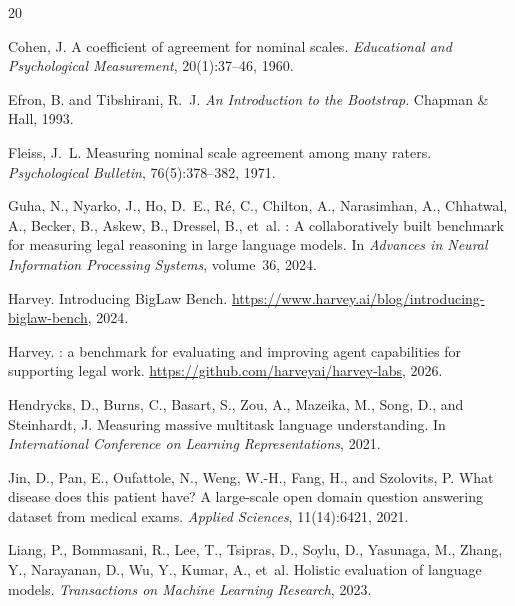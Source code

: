 \documentclass[11pt,a4paper]{article}
\begin{document}
\begin{thebibliography}{20}

Cohen, J.
\newblock A coefficient of agreement for nominal scales.
\newblock \emph{Educational and Psychological Measurement}, 20(1):37--46, 1960.

Efron, B. and Tibshirani, R.~J.
\newblock \emph{An Introduction to the Bootstrap}.
\newblock Chapman \& Hall, 1993.

Fleiss, J.~L.
\newblock Measuring nominal scale agreement among many raters.
\newblock \emph{Psychological Bulletin}, 76(5):378--382, 1971.

Guha, N., Nyarko, J., Ho, D.~E., R\'{e}, C., Chilton, A., Narasimhan, A., Chhatwal, A., Becker, B., Askew, B., Dressel, B., et~al.
: A collaboratively built benchmark for measuring legal reasoning in large language models.
\newblock In \emph{Advances in Neural Information Processing Systems}, volume~36, 2024.

Harvey.
\newblock Introducing {BigLaw Bench}.
\newblock \url{https://www.harvey.ai/blog/introducing-biglaw-bench}, 2024.

Harvey.
: a benchmark for evaluating and improving agent capabilities for supporting legal work.
\newblock \url{https://github.com/harveyai/harvey-labs}, 2026.

Hendrycks, D., Burns, C., Basart, S., Zou, A., Mazeika, M., Song, D., and Steinhardt, J.
\newblock Measuring massive multitask language understanding.
\newblock In \emph{International Conference on Learning Representations}, 2021.

Jin, D., Pan, E., Oufattole, N., Weng, W.-H., Fang, H., and Szolovits, P.
\newblock What disease does this patient have? {A} large-scale open domain question answering dataset from medical exams.
\newblock \emph{Applied Sciences}, 11(14):6421, 2021.

Liang, P., Bommasani, R., Lee, T., Tsipras, D., Soylu, D., Yasunaga, M., Zhang, Y., Narayanan, D., Wu, Y., Kumar, A., et~al.
\newblock Holistic evaluation of language models.
\newblock \emph{Transactions on Machine Learning Research}, 2023.


\end{thebibliography}
\end{document}
